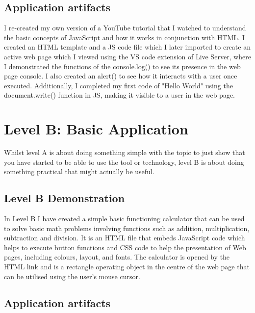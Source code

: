 \documentclass[a4paper, 11pt]{report}
\begin{document}
\cite{LevelA1}
\cite{LevelA2}
\cite{LevelA3}
\cite{LevelA4}
\cite{LevelA5}

\subsection{Application artifacts}
I re-created my own version of a YouTube tutorial that I watched to understand the basic concepts of JavaScript and how it works in conjunction with HTML. I created an HTML template and a JS code file which I later imported to create an active web page which I viewed using the VS code extension of Live Server, where I demonstrated the functions of the console.log() to see its presence in the web page console. I also created an alert() to see how it interacts with a user once executed. Additionally, I completed my first code of "Hello World" using the document.write() function in JS, making it visible to a user in the web page.   



\newpage
\section{Level B: Basic Application}

Whilst level A is about doing something simple with the topic to just show that you have started to be able to use the tool or technology, level B is about doing something practical that might actually be useful.

\subsection{Level B Demonstration}

In Level B I have created a simple basic functioning calculator that can be used to solve basic math problems involving functions such as addition, multiplication, subtraction and division. It is an HTML file that embeds JavaScript code which helps to execute button functions and CSS code to help  the presentation of Web pages, including colours, layout, and fonts. The calculator is opened by the HTML link and is a rectangle operating object in the centre of the web page that can be utilised using the user's mouse cursor. 

\subsection{Application artifacts}
\end{document}
